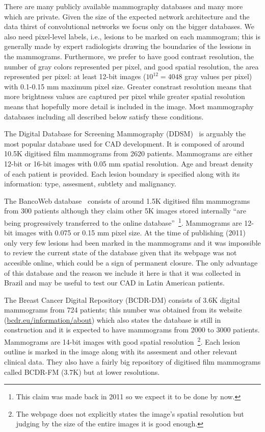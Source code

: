 There are many publicly available mammography databases and many more which are private. Given the size of the expected network architecture and the data thirst of convolutional networks we focus only on the bigger databases. We also need pixel-level labels, i.e., lesions to be marked on each mammogram; this is generally made by expert radiologists drawing the boundaries of the lessions in the mammograms.
Furthermore, we prefer to have good contrast resolution, the number of gray colors represented per pixel, and good spatial resolution, the area represented per pixel: at least 12-bit images ($10^12 = 4048$ gray values per pixel) with 0.1-0.15 mm maximum pixel size. Greater constrast resolution means that more brightness values are captured per pixel while greater spatial resolution means that hopefully more detail is included in the image. Most mammography databases including all described below satisfy these conditions.
 
	The Digital Database for Screening Mammography (DDSM)~\cite{Heath2001} is arguably the most popular database used for CAD development. It is composed of around 10.5K digitised film mammograms from 2620 patients. Mammograms are either 12-bit or 16-bit images with 0.05 mm spatial resolution. Age and breast density of each patient is provided. Each lesion boundary is specified along with its information: type, assesment, subtlety and malignancy.

	The BancoWeb database~\cite{Nepomuceno2011} consists of around 1.5K digitised film mammograms from 300 patients although they claim other 5K images stored internally ``are being progressively transferred to the online database''~\footnote{This claim was made back in 2011 so we expect it to be done by now.}. Mammograms are 12-bit images with 0.075 or 0.15 mm pixel size. At the time of publishing (2011) only very few lesions had been marked in the mammograms and it was impossible to review the current state of the database given that its webpage was not accesible online, which could be a sign of permanent closure. The only advantage of this database and the reason we include it here is that it was collected in Brazil and may be useful to test our CAD in Latin American patients.

	The Breast Cancer Digital Repository (BCDR-DM) consists of 3.6K digital mammograms from 724 patients; this number was obtained from its website (\url{bcdr.eu/information/about}) which also states the database is still in construction and it is expected to have mammograms from 2000 to 3000 patients. Mammograms are 14-bit images with good spatial resolution~\footnote{The webpage does not explicitly states the image's spatial resolution but judging by the size of the entire images it is good enough.}. Each lesion outline is marked in the image along with its assesment and other relevant clinical data. They also have a fairly big repository of digitised film mammograms called BCDR-FM (3.7K) but at lower resolutions.

